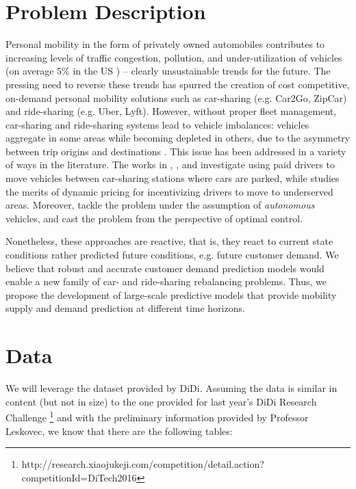 \documentclass[10pt]{article}
\begin{document}
\maketitle

\section{Problem Description}

Personal mobility in the form of privately owned automobiles contributes to increasing levels of traffic congestion, pollution, and under-utilization of vehicles (on average 5\% in the US \cite{DN:15}) -- clearly unsustainable trends for the future. The pressing need to reverse these trends has spurred the creation of cost competitive, on-demand personal mobility solutions such as car-sharing (e.g. Car2Go, ZipCar) and ride-sharing (e.g. Uber, Lyft).
However, without proper fleet management, car-sharing and ride-sharing systems lead to vehicle imbalances: vehicles aggregate in some areas while becoming depleted in others, due to the asymmetry between trip origins and destinations \cite{RZ-MP:15_MODa}. This issue has been addressed in a variety of ways in the literature. The works in \cite{MN-SZ-SB-MJR:15}, \cite{BB-KGZ-NG:15}, and \cite{FA-DDP-AR:14} investigate using paid drivers to move vehicles between car-sharing stations where cars are parked, while \cite{SB-RJ-CR:15} studies the merits of dynamic pricing for incentivizing drivers to move to underserved areas. Moreover, \cite{RZ-MP:15_MODa,RI-FR-RZ-MP:16,RZ-FR-MP:16,RZ-FR-MP:16a} tackle the problem under the assumption of \emph{autonomous} vehicles, and cast the problem from the perspective of optimal control.

Nonetheless, these approaches are reactive, that is, they react to current state conditions rather predicted future conditions, e.g. future customer demand. We believe that robust and accurate customer demand prediction models would enable a new family of car- and ride-sharing rebalancing problems. Thus, we propose the development of large-scale predictive models that provide mobility supply and demand prediction at different time horizons.

\section{Data}

We will leverage the dataset provided by DiDi. Assuming the data is similar in content (but not in size) to the one provided for last year's DiDi Research Challenge \footnote{http://research.xiaojukeji.com/competition/detail.action?competitionId=DiTech2016} and with the preliminary information provided by Professor Leskovec, we know that there are the following tables:
\end{document}
